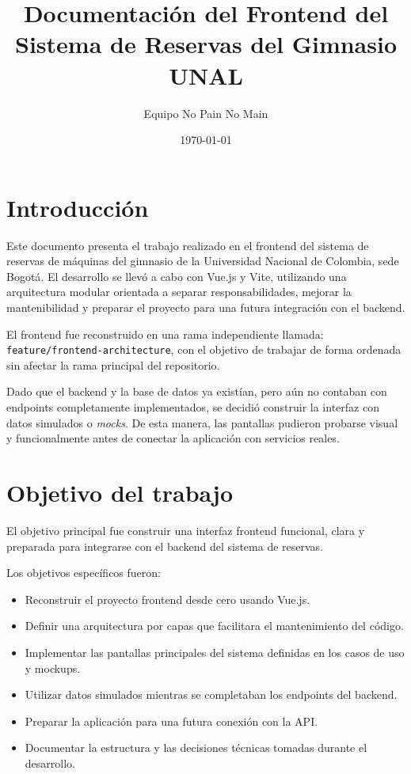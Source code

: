 \documentclass[12pt]{article}
\title{\textbf{Documentación del Frontend del Sistema de Reservas del Gimnasio UNAL}}
\author{Equipo No Pain No Main}
\date{\today}
\begin{document}
\maketitle

\section{Introducción}

Este documento presenta el trabajo realizado en el frontend del sistema de reservas de máquinas del gimnasio de la Universidad Nacional de Colombia, sede Bogotá. El desarrollo se llevó a cabo con Vue.js y Vite, utilizando una arquitectura modular orientada a separar responsabilidades, mejorar la mantenibilidad y preparar el proyecto para una futura integración con el backend.

El frontend fue reconstruido en una rama independiente llamada:\\
\texttt{feature/frontend-architecture}, con el objetivo de trabajar de forma ordenada sin afectar la rama principal del repositorio.

Dado que el backend y la base de datos ya existían, pero aún no contaban con endpoints completamente implementados, se decidió construir la interfaz con datos simulados o \textit{mocks}. De esta manera, las pantallas pudieron probarse visual y funcionalmente antes de conectar la aplicación con servicios reales.

\section{Objetivo del trabajo}

El objetivo principal fue construir una interfaz frontend funcional, clara y preparada para integrarse con el backend del sistema de reservas.

Los objetivos específicos fueron:

\begin{itemize}
    \item Reconstruir el proyecto frontend desde cero usando Vue.js.
    \item Definir una arquitectura por capas que facilitara el mantenimiento del código.
    \item Implementar las pantallas principales del sistema definidas en los casos de uso y mockups.
    \item Utilizar datos simulados mientras se completaban los endpoints del backend.
    \item Preparar la aplicación para una futura conexión con la API.
    \item Documentar la estructura y las decisiones técnicas tomadas durante el desarrollo.
\end{itemize}
\end{document}
